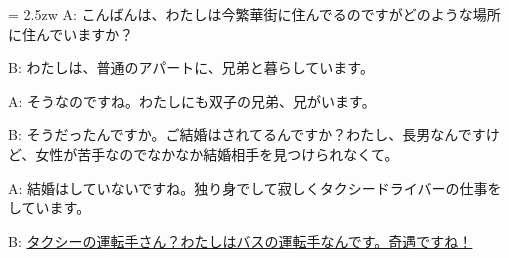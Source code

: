 \documentclass[11pt]{amsart}
\title{}
\author{}
\newenvironment{hangall}[1]{\hangindent = 2.5zw\everypar{\hangindent = 2.5zw}}{}
\begin{document}
\maketitle
\begin{hangall}{}%
A: こんばんは、わたしは今繁華街に住んでるのですがどのような場所に住んでいますか？

B: わたしは、普通のアパートに、兄弟と暮らしています。

A: そうなのですね。わたしにも双子の兄弟、兄がいます。

B: そうだったんですか。ご結婚はされてるんですか？わたし、長男なんですけど、女性が苦手なのでなかなか結婚相手を見つけられなくて。

A: 結婚はしていないですね。独り身でして寂しくタクシードライバーの仕事をしています。

B: \ul{タクシーの運転手さん？わたしはバスの運転手なんです。奇遇ですね！}\end{hangall}
\end{document}
